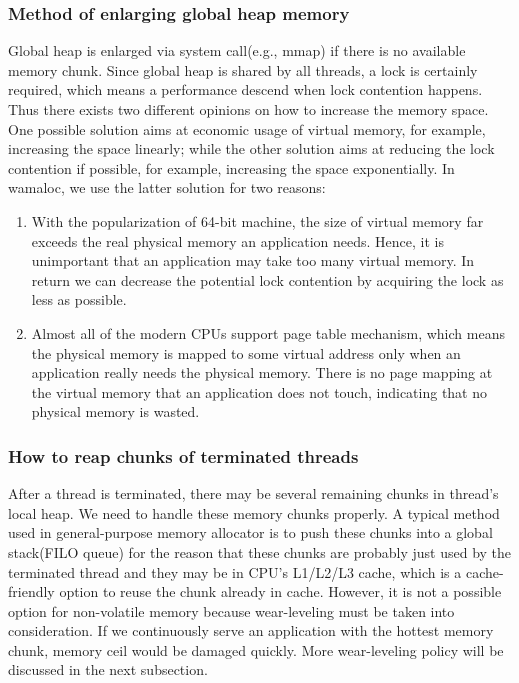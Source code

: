 \documentclass{vldb}
\begin{document}
\subsubsection{Method of enlarging global heap memory}
Global heap is enlarged via system call(e.g., mmap) if there is no available memory chunk.
Since global heap is shared by all threads, a lock is certainly required, which means a performance descend when lock contention happens.
Thus there exists two different opinions on how to increase the memory space. 
One possible solution aims at economic usage of virtual memory, for example, increasing the space linearly;
while the other solution aims at reducing the lock contention if possible, for example, increasing the space exponentially. 
In wamaloc, we use the latter solution for two reasons: 
\begin{enumerate}
    \item With the popularization of 64-bit machine, the size of virtual memory far exceeds the real physical memory an application needs.
Hence, it is unimportant that an application may take too many virtual memory. In return we can decrease the potential lock contention by acquiring the lock as less as possible.
    \item Almost all of the modern CPUs support page table mechanism, 
        which means the physical memory is mapped to some virtual address only when an application really needs the physical memory. 
        There is no page mapping at the virtual memory that an application does not touch, indicating that no physical memory is wasted.
\end{enumerate}

\subsubsection{How to reap chunks of terminated threads}
After a thread is terminated, there may be several remaining chunks in thread's local heap. 
We need to handle these memory chunks properly.
A typical method used in general-purpose memory allocator is to push these chunks into a global stack(FILO queue)
for the reason that these chunks are probably just used by the terminated thread and they may be in CPU's L1/L2/L3 cache, which is a cache-friendly option to reuse the chunk already in cache.
However, it is not a possible option for non-volatile memory because wear-leveling must be taken into consideration.
If we continuously serve an application with the hottest memory chunk, memory ceil would be damaged quickly.
More wear-leveling policy will be discussed in the next subsection.
\end{document}
